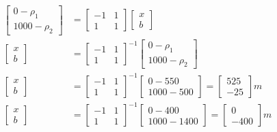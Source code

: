\documentclass[12pt]{article}
\begin{document}
\begin{adjustwidth}{10mm}{0mm}
    \begin{equation}
      \begin{split}
        \begin{bmatrix}
          0 - \rho_1 \\ 1000 - \rho_2 
        \end{bmatrix}
        &=
        \begin{bmatrix}
          -1 & 1 \\ 1 & 1
        \end{bmatrix}
        \begin{bmatrix}
          x \\ b
        \end{bmatrix} 
        \\
        \begin{bmatrix}
          x \\ b 
        \end{bmatrix}
        &=
        \begin{bmatrix}
          -1 & 1 \\ 1 & 1
        \end{bmatrix}^{-1}
        \begin{bmatrix}
          0 - \rho_1 \\ 1000 - \rho_2
        \end{bmatrix} 
        \\
        \begin{bmatrix}
          x \\ b 
        \end{bmatrix}
        &=
        \begin{bmatrix}
          -1 & 1 \\ 1 & 1
        \end{bmatrix}^{-1}
        \begin{bmatrix}
          0 - 550 \\ 1000 - 500
        \end{bmatrix}
        =
        \begin{bmatrix}
          525 \\ -25
        \end{bmatrix} \si{m}
        \\
        \begin{bmatrix}
          x \\ b 
        \end{bmatrix}
        &=
        \begin{bmatrix}
          -1 & 1 \\ 1 & 1
        \end{bmatrix}^{-1}
        \begin{bmatrix}
          0 - 400 \\ 1000 - 1400
        \end{bmatrix}
        =
        \begin{bmatrix}
          0 \\ -400
        \end{bmatrix} \si{m}
      \end{split}
    \end{equation}
  \end{adjustwidth}
\end{document}
